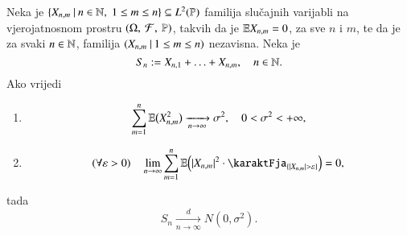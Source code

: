 \begin{tm}  \label{tm:19.4}
    Neka je $\{{X_{n, m}} \: | \: {n \in \mathbb{N}, \; 1 \leq m \leq n}\} \subseteq L^2 (\mathbb{P})$ familija slu\v cajnih varijabli na vjerojatnosnom prostru $(\Omega, \: \mathcal{F}, \: \mathbb{P})$, takvih da je $\mathbb{E} X_{n, m} = 0$, za sve $n$ i $m$, te da je za svaki $n \in \mathbb{N}$, familija $({X_{n, m}} \: | \: { 1 \leq m \leq n})$ nezavisna.
    Neka je
    \begin{equation*}
        S_n := X_{n, 1} + \ldots + X_{n, m}, \quad n \in \mathbb{N}.
    \end{equation*}
    Ako vrijedi
    \begin{enumerate}[label=(\alph*)]
        \item \label{tm:19.4.1}
        \begin{equation*}
            \sum\limits_{m = 1}^{n} \mathbb{E} \big( X_{n, m}^2 \big) \xrightarrow[n \to \infty]{} \sigma^2, \quad 0 < \sigma^2 < +\infty,
        \end{equation*}
        \item \label{tm:19.4.2}
        \begin{equation*}
            (\forall \varepsilon > 0) \quad \lim\limits_{n \to \infty} \suma{m = 1}{n} \masE \Big( |X_{n, m}|^2 \cdot \karaktFja_{\{ |X_{n, m}| > \varepsilon \}} \Big) = 0,
        \end{equation*}
    \end{enumerate}
    tada
    \begin{equation*}
        S_n \xrightarrow[n \to \infty]{d}  N (0, \sigma^2).
    \end{equation*}
\end{tm}

